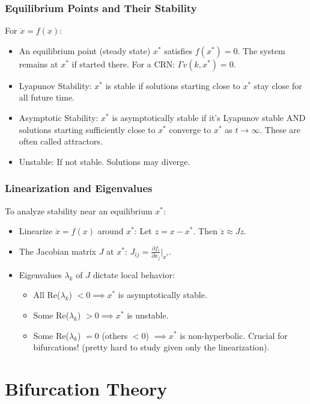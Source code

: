 \documentclass[aspectratio=169]{beamer}
\begin{document}
\begin{frame}{\insertsectionhead}
	\frametitle{Equilibrium Points and Their Stability}
	For $\dot{x} = f(x)$:
	\begin{itemize}
		\item An \alert{equilibrium point} (steady state) $x^*$ satisfies $f(x^*) = 0$. The system remains at $x^*$ if started there.
			For a CRN: $\Gamma v(k, x^*) = 0$.
		\item \alert{Lyapunov Stability}: $x^*$ is stable if solutions starting close to $x^*$ stay close for all future time.
		\item \alert{Asymptotic Stability}: $x^*$ is asymptotically stable if it's Lyapunov stable AND solutions starting sufficiently close to $x^*$ converge to $x^*$ as $t \to \infty$. These are often called \alert{attractors}.
		\item \alert{Unstable}: If not stable. Solutions may diverge.
	\end{itemize}
\end{frame}

\begin{frame}{\insertsectionhead}
	\frametitle{Linearization and Eigenvalues}
	To analyze stability near an equilibrium $x^*$:
	\begin{itemize}
		\item \alert{Linearize} $\dot{x}=f(x)$ around $x^*$: Let $z = x - x^*$. Then $\dot{z} \approx J z$.
		\item The \alert{Jacobian matrix} $J$ at $x^*$: $J_{ij} = \frac{\partial f_i}{\partial x_j} \bigg|_{x^*}$.
		\item \alert{Eigenvalues $\lambda_k$} of $J$ dictate local behavior:
			\begin{itemize}
				\item All Re($\lambda_k$) $< 0 \implies x^*$ is asymptotically stable.
				\item Some Re($\lambda_k$) $> 0 \implies x^*$ is unstable.
				\item Some Re($\lambda_k$) $= 0$ (others $<0$) $\implies x^*$ is non-hyperbolic. \alert{Crucial for bifurcations!} (pretty hard to study given only the linearization).
			\end{itemize}
	\end{itemize}
\end{frame}

\section{Bifurcation Theory}
\end{document}
